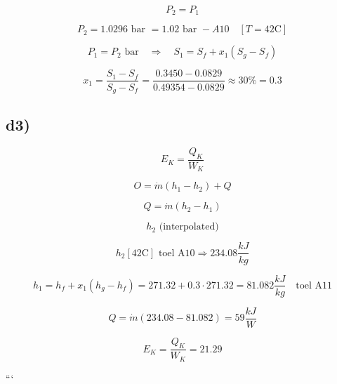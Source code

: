 \[
P_2 = P_1
\]

\[
P_2 = 1.0296 \text{ bar } = 1.02 \text{ bar } - A10 \quad [T = 42 \text{C}]
\]

\[
P_1 = P_2 \text{ bar} \quad \Rightarrow \quad S_1 = S_f + x_1 (S_g - S_f)
\]

\[
x_1 = \frac{S_1 - S_f}{S_g - S_f} = \frac{0.3450 - 0.0829}{0.49354 - 0.0829} \approx 30\% = 0.3
\]

\subsection*{d3)}
\[
E_K = \frac{Q_K}{W_K}
\]

\[
O = \dot{m} (h_1 - h_2) + Q
\]

\[
Q = \dot{m} (h_2 - h_1)
\]

\[
h_2 \text{ (interpolated)}
\]

\[
h_2 [42 \text{C}] \text{ toel A10} \Rightarrow 234.08 \frac{kJ}{kg}
\]

\[
h_1 = h_f + x_1 (h_g - h_f) = 271.32 + 0.3 \cdot 271.32 = 81.082 \frac{kJ}{kg} \quad \text{toel A11}
\]

\[
Q = \dot{m} (234.08 - 81.082) = 59 \frac{kJ}{W}
\]

\[
E_K = \frac{Q_K}{W_K} = 21.29
\]

```